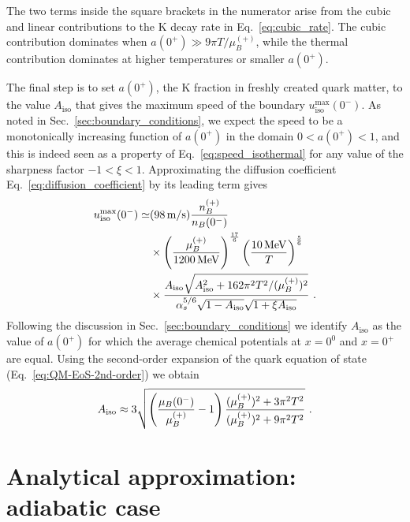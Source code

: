 \documentclass[10pt,superscriptaddress,
amsmath,aps,prc,twocolumn,nofootinbib,floatfix]{revtex4-1}
\newcommand{\mga}[1]{{\color[rgb]{0.6,0,0}#1}}
\newcommand{\mgacom}[1]{\textsf{\color[rgb]{0.8,0,0}[\textsuperscript{MGA} #1]}}
\newcommand{\MeV}{\text{MeV}}
\begin{document}
The two terms inside the square brackets in the numerator arise from the cubic and linear contributions to the K decay rate in Eq.~\eqref{eq:cubic_rate}.
The cubic contribution dominates when \mga{$a(0^+)\gg 9\pi T/\mu_B^{(+)}$}, while the thermal contribution dominates at \mga{higher temperatures or smaller $a(0^+)$.}

\mga{
The final step is to set $a(0^+)$, the K fraction in freshly created quark matter, to the value $A_\text{iso}$ that gives the maximum speed of the boundary $u^{\max}_\text{iso}(0^-)$.  As noted in Sec.~\ref{sec:boundary_conditions}, we expect the speed to be a monotonically increasing function of $a(0^+)$ in the domain $0<a(0^+)<1$, and this is indeed seen as a property of Eq.~\eqref{eq:speed_isothermal} for any value of the sharpness factor $-1<\xi<1$. 
Approximating the diffusion coefficient Eq.~\eqref{eq:diffusion_coefficient} by its leading term gives}
\begin{equation}
\begin{aligned}
u^{\max}_{\rm iso}(0^-)\simeq&(98\, {\rm m/s})
\frac{n_B^{(+)}}{n_B(0^-)}\\
&\times\left(\frac{\mu_B^{(+)}}{1200\,\MeV}\right)^\frac{17}{6}
\left(\frac{10\,\MeV}{T}\right)^\frac{5}{6}\\
&\times\frac{A_{\rm iso}\sqrt{A_{\rm iso}^2+162\pi^2T^2/(\mu_B^{(+)})^2}}
{\alpha_s^{5/6}\sqrt{1-A_{\rm iso}}\sqrt{1+\xi A_{\rm iso}}}\ .
\end{aligned}
\label{eq:isothermal_speed_scaling}
\end{equation}
%
\mga{Following the discussion in Sec.~\ref{sec:boundary_conditions} we identify $A_{\text{iso}}$ as the value of $a(0^+)$ for which the average chemical potentials at $x=0^0$ and $x=0^+$ are equal.}
Using the second-order expansion of the quark equation of state (Eq.~\eqref{eq:QM-EoS-2nd-order})
we  obtain
\begin{equation}
A_{\rm iso} \approx 3\sqrt{\left(\dfrac{\mu_B(0^-)}{\mu_B^{(+)}}-1\right)\dfrac{(\mu_B^{(+)})^2+3\pi^2T^2}{(\mu_B^{(+)})^2+9\pi^2T^2}} \ .
\label{eq:a0plus_max}
\end{equation}



\section{Analytical approximation: adiabatic case}
\label{sec:adiabatic-analytic}
\end{document}

